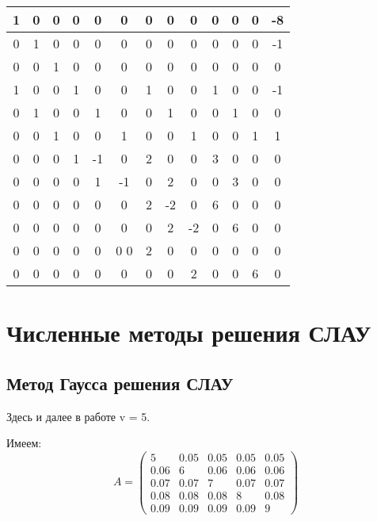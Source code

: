 \documentclass[bachelor, och, pract]{SCWorks}
\begin{document}
\begin{table}[H]
    \centering
    \begin{tabular}{|c|c|c|c|c|c|c|c|c|c|c|c|c|}
\hline   1  &  0 &   0  &  0 &   0  &  0  &  0 &   0  &  0  &  0  &  0  &  0   &   -8\\\hline
   0  &  1  &  0 &   0  &  0   &  0   &  0  &   0   &  0  &  0  &  0  &  0   &-1 \\\hline
   0  &  0  &  1   &  0  &   0  &   0  & 0  &    0  &   0   &  0   &  0  &   0    &    0  \\\hline
   1  &  0 &   0  &   1  &   0  &   0  &   1  &   0    & 0   &  1   &  0  &   0     &   -1  \\\hline
   0 &   1  &  0  &   0  &   1  &   0   &  0  &   1   &  0  &   0  &   1  &   0   &       0\\\hline
   0  &  0  &  1   &  0   &  0   &  1   &  0  &   0   &  1   &  0   &  0   &  1   &     1 \\\hline
   0  &  0  &  0   &  1   & -1   &  0  &   2    & 0   &  0    & 3   &  0   &  0    &   0 \\\hline
   0 &   0 &   0   &  0   &  1  &  -1   &  0  &   2  &   0   &  0  &   3 &   0    &   0 \\\hline
   0  &  0   & 0   &  0  &   0  &   0   &  2   & -2   &  0  &  6   &  0   &  0  &    0 \\\hline
   0 &   0  &  0  &   0   &  0  &   0   &  0    & 2  &  -2    & 0   &  6  &   0  &     0 \\\hline
   0  &  0  &  0  &   0   &  0  &   0 0  &  2  &   0   &  0   &  0   &  0   &  0    &    0 \\\hline
   0  &  0   & 0  &   0   &  0  &   0   &  0   &  0  &   2  &  0   &  0  &   6    &    0 \\\hline
    \end{tabular}
\end{table}


\section{Численные методы решения СЛАУ}

\subsection{Метод Гаусса решения СЛАУ}

Здесь и далее в работе v = 5.

Имеем:
$$ A = 
\begin{pmatrix}
5 & 0.05 & 0.05 & 0.05 & 0.05 \\
0.06 & 6 & 0.06 & 0.06 & 0.06 \\
0.07 & 0.07 & 7 & 0.07 & 0.07 \\
0.08 & 0.08 & 0.08 & 8 & 0.08 \\
0.09 & 0.09 & 0.09 & 0.09 & 9 
\end{pmatrix}
$$
\end{document}
